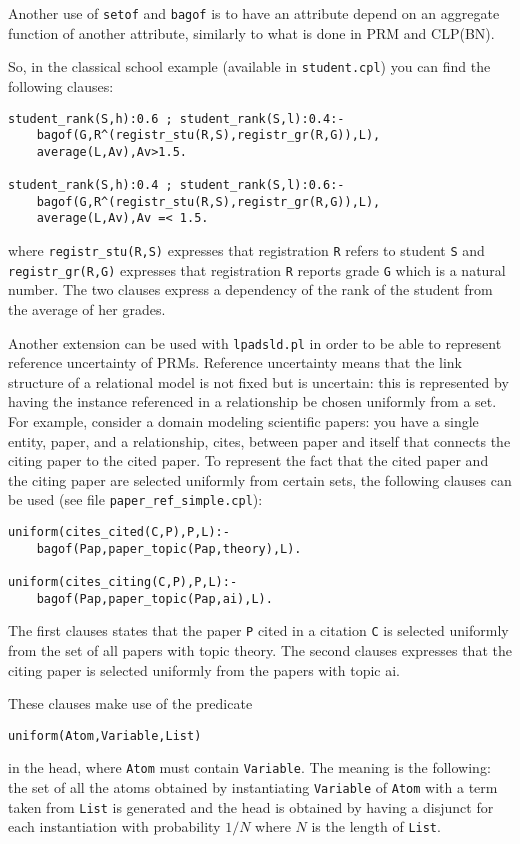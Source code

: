 \documentclass[a4paper,10pt]{article}
\begin{document}
Another use of \texttt{setof} and \texttt{bagof} is to have an attribute depend on an aggregate function of another attribute, similarly to what is done in PRM and CLP(BN).

So, in the classical school example (available in \texttt{student.cpl}) you can find the following
clauses:
\begin{verbatim}
student_rank(S,h):0.6 ; student_rank(S,l):0.4:- 
    bagof(G,R^(registr_stu(R,S),registr_gr(R,G)),L),
    average(L,Av),Av>1.5.

student_rank(S,h):0.4 ; student_rank(S,l):0.6:- 
    bagof(G,R^(registr_stu(R,S),registr_gr(R,G)),L),
    average(L,Av),Av =< 1.5.
\end{verbatim}
where \verb|registr_stu(R,S)| expresses that registration \texttt{R} refers to student \texttt{S} and \verb|registr_gr(R,G)| expresses that registration \texttt{R} reports  grade \texttt{G} which is a natural number. The two clauses express a dependency of the rank of the student from the average of her grades.

Another extension can be used with \texttt{lpadsld.pl} in order to be able to represent  reference uncertainty of PRMs. Reference uncertainty means that the link structure of a relational model is not fixed but is uncertain: this is represented by having the instance referenced in a relationship be chosen uniformly from a set. For example, consider a domain modeling scientific papers: you have a single entity, paper, and a relationship, cites, between paper and itself that connects the citing paper to the cited paper. To represent the fact that the cited paper and the citing paper are selected uniformly from certain sets, the following clauses can be used (see file \verb|paper_ref_simple.cpl|):
\begin{verbatim}
uniform(cites_cited(C,P),P,L):-
    bagof(Pap,paper_topic(Pap,theory),L).

uniform(cites_citing(C,P),P,L):-
    bagof(Pap,paper_topic(Pap,ai),L).
\end{verbatim}
The first clauses states that the  paper \texttt{P} cited in a citation \texttt{C} is selected uniformly from the set of all papers with topic theory.
The second clauses expresses that the citing paper is selected uniformly from the papers with
topic ai.

These clauses make use of the predicate
\begin{verbatim}
uniform(Atom,Variable,List)
\end{verbatim}
in the head, where \texttt{Atom} must contain \texttt{Variable}. The meaning is the following: the set of all the atoms obtained by instantiating \texttt{Variable} of \texttt{Atom} with a term taken from \texttt{List} is generated and the head is obtained by having a disjunct for each instantiation with probability $1/N$ where $N$ is the length of \texttt{List}.
\end{document}

